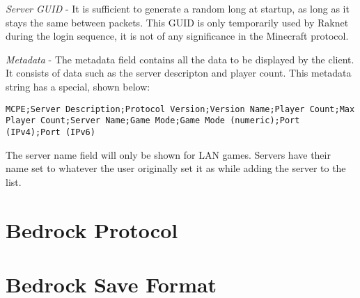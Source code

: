 \documentclass[12pt]{report}
\begin{document}
\textit{Server GUID} - It is sufficient to generate a random long at startup, as long as it stays the same between packets.
This GUID is only temporarily used by Raknet during the login sequence, it is not of any significance in the Minecraft protocol.

\textit{Metadata} - The metadata field contains all the data to be displayed by the client.
It consists of data such as the server descripton and player count.
This metadata string has a special, shown below:

\texttt{MCPE;Server Description;Protocol Version;Version Name;Player Count;Max Player Count;Server Name;Game Mode;Game Mode (numeric);Port (IPv4);Port (IPv6)}

The server name field will only be shown for LAN games.
Servers have their name set to whatever the user originally set it as while adding the server to the list.



\chapter{Bedrock Protocol}

\chapter{Bedrock Save Format}
\end{document}
